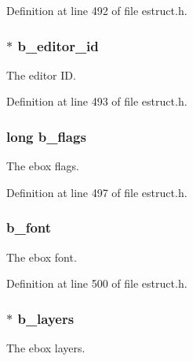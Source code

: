 Definition at line 492 of file estruct.\-h.

\hypertarget{struct__edspbox_adf8c80c6ea45ad810c754984d98830ff}{
\subsubsection[{b\-\_\-editor\-\_\-id}]{$\ast$ b\-\_\-editor\-\_\-id}}\label{struct__edspbox_adf8c80c6ea45ad810c754984d98830ff}
The editor I\-D. 

Definition at line 493 of file estruct.\-h.

\hypertarget{struct__edspbox_abdae234dbd983dfbfb0592858c4ff026}{
\subsubsection[{b\-\_\-flags}]{\setlength{\rightskip}{0pt plus 5cm}long b\-\_\-flags}}\label{struct__edspbox_abdae234dbd983dfbfb0592858c4ff026}
The ebox flags. 

Definition at line 497 of file estruct.\-h.

\hypertarget{struct__edspbox_a4071412a20456f5fcafe2a91cdef11c3}{
\subsubsection[{b\-\_\-font}]{ b\-\_\-font}}\label{struct__edspbox_a4071412a20456f5fcafe2a91cdef11c3}
The ebox font. 

Definition at line 500 of file estruct.\-h.

\hypertarget{struct__edspbox_ad80949f483467d74761a9e321300d64e}{
\subsubsection[{b\-\_\-layers}]{$\ast$ b\-\_\-layers}}\label{struct__edspbox_ad80949f483467d74761a9e321300d64e}
The ebox layers. 

